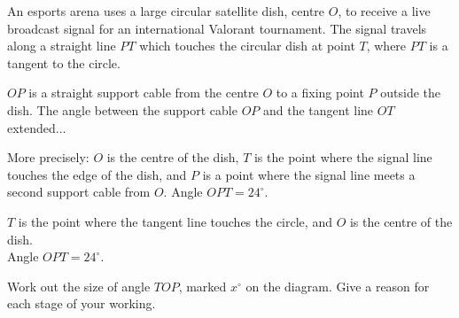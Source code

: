 \begin{question}
\noindent An esports arena uses a large circular satellite dish, centre $O$, to receive a live broadcast signal for an international Valorant tournament. The signal travels along a straight line $PT$ which touches the circular dish at point $T$, where $PT$ is a tangent to the circle.

\noindent $OP$ is a straight support cable from the centre $O$ to a fixing point $P$ outside the dish. The angle between the support cable $OP$ and the tangent line $OT$ extended... 

\noindent More precisely: $O$ is the centre of the dish, $T$ is the point where the signal line touches the edge of the dish, and $P$ is a point where the signal line meets a second support cable from $O$. Angle $OPT = 24^\circ$.

\begin{center}
\end{center}

\noindent $T$ is the point where the tangent line touches the circle, and $O$ is the centre of the dish.\\
Angle $OPT = 24^\circ$.

\noindent Work out the size of angle $TOP$, marked $x^\circ$ on the diagram. Give a reason for each stage of your working.

\vspace{5cm}

\begin{flushright}
\end{flushright}
\end{question}
